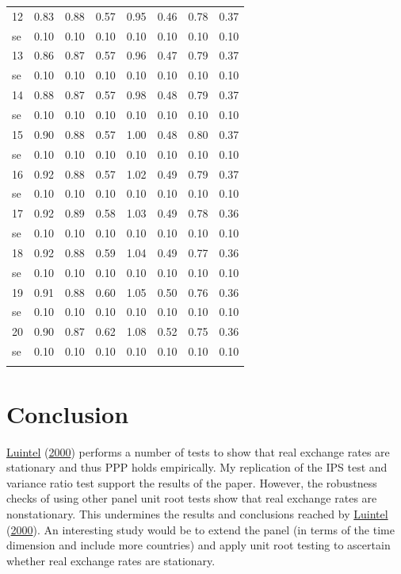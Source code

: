 \documentclass[11pt,preprint, authoryear]{elsarticle}
\numberwithin{equation}{section}
\numberwithin{figure}{section}
\numberwithin{table}{section}
\begin{document}
\begin{longtable}{lrrrrrrr}
  12 & 0.83 & 0.88 & 0.57 & 0.95 & 0.46 & 0.78 & 0.37 \\ 
  se & 0.10 & 0.10 & 0.10 & 0.10 & 0.10 & 0.10 & 0.10 \\ 
  13 & 0.86 & 0.87 & 0.57 & 0.96 & 0.47 & 0.79 & 0.37 \\ 
  se & 0.10 & 0.10 & 0.10 & 0.10 & 0.10 & 0.10 & 0.10 \\ 
  14 & 0.88 & 0.87 & 0.57 & 0.98 & 0.48 & 0.79 & 0.37 \\ 
  se & 0.10 & 0.10 & 0.10 & 0.10 & 0.10 & 0.10 & 0.10 \\ 
  15 & 0.90 & 0.88 & 0.57 & 1.00 & 0.48 & 0.80 & 0.37 \\ 
  se & 0.10 & 0.10 & 0.10 & 0.10 & 0.10 & 0.10 & 0.10 \\ 
  16 & 0.92 & 0.88 & 0.57 & 1.02 & 0.49 & 0.79 & 0.37 \\ 
  se & 0.10 & 0.10 & 0.10 & 0.10 & 0.10 & 0.10 & 0.10 \\ 
  17 & 0.92 & 0.89 & 0.58 & 1.03 & 0.49 & 0.78 & 0.36 \\ 
  se & 0.10 & 0.10 & 0.10 & 0.10 & 0.10 & 0.10 & 0.10 \\ 
  18 & 0.92 & 0.88 & 0.59 & 1.04 & 0.49 & 0.77 & 0.36 \\ 
  se & 0.10 & 0.10 & 0.10 & 0.10 & 0.10 & 0.10 & 0.10 \\ 
  19 & 0.91 & 0.88 & 0.60 & 1.05 & 0.50 & 0.76 & 0.36 \\ 
  se & 0.10 & 0.10 & 0.10 & 0.10 & 0.10 & 0.10 & 0.10 \\ 
  20 & 0.90 & 0.87 & 0.62 & 1.08 & 0.52 & 0.75 & 0.36 \\ 
  se & 0.10 & 0.10 & 0.10 & 0.10 & 0.10 & 0.10 & 0.10 \\ 
   \bottomrule
\label{v}
\end{longtable}
\endgroup

\hypertarget{conclusion}{%
\section{Conclusion}\label{conclusion}}

\protect\hyperlink{ref-Kul}{Luintel} (\protect\hyperlink{ref-Kul}{2000})
performs a number of tests to show that real exchange rates are
stationary and thus PPP holds empirically. My replication of the IPS
test and variance ratio test support the results of the paper. However,
the robustness checks of using other panel unit root tests show that
real exchange rates are nonstationary. This undermines the results and
conclusions reached by \protect\hyperlink{ref-Kul}{Luintel}
(\protect\hyperlink{ref-Kul}{2000}). An interesting study would be to
extend the panel (in terms of the time dimension and include more
countries) and apply unit root testing to ascertain whether real
exchange rates are stationary.
\end{document}
